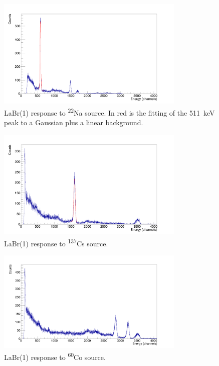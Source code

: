 \documentclass[a4paper,12pt]{report}
\newcommand{\Na}{\textsuperscript{22}Na }
\begin{document}
\begin{figure}[H]
	\centering
	\includegraphics[width=0.80\textwidth]{labr_na22_calibration.png}
	\caption{LaBr(1) response to \Na source. In red is the fitting of the \qty{511}{\keV} peak to a Gaussian plus a linear background.}
	\label{labr_na22_calibration}
\end{figure}

\begin{figure}[H]
	\centering
	\includegraphics[width=0.80\textwidth]{labr_cs137_calibration.png}
	\caption{LaBr(1) response to \textsuperscript{137}Cs source.}
	\label{labr_cs137_calibration}
\end{figure}

\begin{figure}[H]
	\centering
	\includegraphics[width=0.80\textwidth]{labr_co60_calibration.png}
	\caption{LaBr(1) response to \textsuperscript{60}Co source.}
	\label{labr_co60_calibration}
\end{figure}
\end{document}
